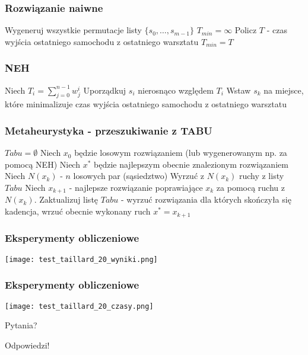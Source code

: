 \documentclass{beamer}
\theoremstyle{example}
\theoremstyle{example}
\theoremstyle{example}
\begin{document}
\begin{frame}
\frametitle{Rozwiązanie naiwne}	


\begin{algorithmic}[1]
\STATE Wygeneruj wszystkie permutacje listy $\{ s_0,\dots , s_{m-1}\}$
\STATE $T_{min} = \infty$
\STATE Policz $T$ - czas wyjścia ostatniego samochodu z ostatniego warsztatu
\STATE $T_{min} = T$ 
\ENDIF
\ENDFOR
\end{algorithmic}
\end{frame}

\begin{frame}
\frametitle{NEH}	


\begin{algorithmic}[1]
\STATE Niech $T_i = \sum\limits_{j=0}^{n-1} w_j^i$
\STATE Uporządkuj $s_i$ nierosnąco względem $T_i$
\STATE Wstaw $s_k$ na miejsce, które minimalizuje czas wyjścia ostatniego samochodu z ostatniego warsztatu
\ENDFOR 
\end{algorithmic}
\end{frame}

\begin{frame}
\frametitle{Metaheurystyka - przeszukiwanie z TABU}	
\begin{algorithmic}[1]
\STATE $Tabu = \emptyset$
\STATE Niech $x_0$ będzie losowym rozwiązaniem (lub wygenerowanym np. za pomocą NEH)
\STATE Niech $x^*$ będzie najlepszym obecnie znalezionym rozwiązaniem
\STATE Niech $N(x_k)$ - $n$ losowych par (sąsiedztwo)
\STATE Wyrzuć z $N(x_k)$ ruchy z listy $Tabu$
\STATE Niech $x_{k+1}$ - najlepsze rozwiązanie poprawiające $x_k$ za pomocą ruchu z $N(x_k)$.
\STATE Zaktualizuj listę $Tabu$ - wyrzuć rozwiązania dla których skończyła się kadencja, wrzuć obecnie wykonany ruch
\STATE $x^*=x_{k+1}$
\ENDIF
\ENDFOR
\end{algorithmic}

\end{frame}

\begin{frame}
\frametitle{Eksperymenty obliczeniowe}	
\texttt{[image: test\_taillard\_20\_wyniki.png]}
\end{frame}

\begin{frame}
\frametitle{Eksperymenty obliczeniowe}	
\texttt{[image: test\_taillard\_20\_czasy.png]}
\end{frame}


\begin{frame}
\Huge{\centerline{Pytania?}}
\end{frame}


\begin{frame}
\Huge{\centerline{Odpowiedzi!}}
\end{frame}

\end{document}
